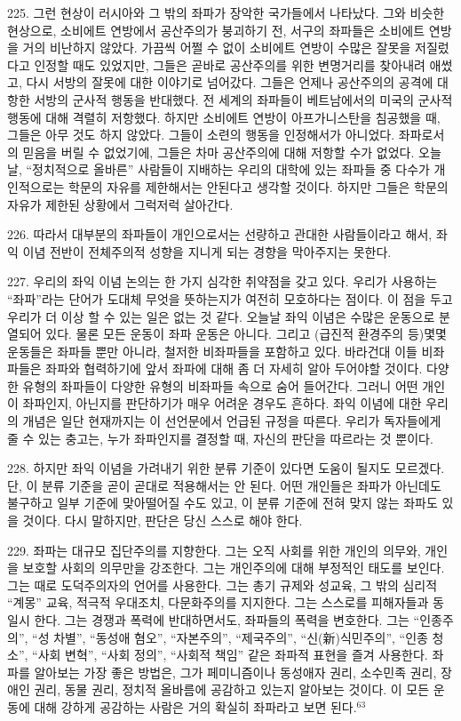 \documentclass[11pt,a4paper]{article}
\begin{document}
\begin{multicols}{2}
225. 그런 현상이 러시아와 그 밖의 좌파가 장악한 국가들에서 나타났다. 그와 비슷한 현상으로,  소비에트 연방에서 공산주의가 붕괴하기 전, 서구의 좌파들은 소비에트 연방을 거의 비난하지 않았다.  가끔씩 어쩔 수 없이 소비에트 연방이 수많은 잘못을 저질렀다고 인정할 때도 있었지만, 그들은 곧바로  공산주의를 위한 변명거리를 찾아내려 애썼고, 다시 서방의 잘못에 대한 이야기로 넘어갔다. 그들은  언제나 공산주의의 공격에 대항한 서방의 군사적 행동을 반대했다. 전 세계의 좌파들이 베트남에서의  미국의 군사적 행동에 대해 격렬히 저항했다. 하지만 소비에트 연방이 아프가니스탄을 침공했을 때,  그들은 아무 것도 하지 않았다. 그들이 소련의 행동을 인정해서가 아니었다. 좌파로서의 믿음을 버릴 수  없었기에, 그들은 차마 공산주의에 대해 저항할 수가 없었다. 오늘날, “정치적으로 올바른” 사람들이  지배하는 우리의 대학에 있는 좌파들 중 다수가 개인적으로는 학문의 자유를 제한해서는 안된다고 생각할 것이다. 하지만 그들은 학문의 자유가 제한된 상황에서 그럭저럭 살아간다. 


226. 따라서 대부분의 좌파들이 개인으로서는 선량하고 관대한 사람들이라고 해서, 좌익 이념 전반이  전체주의적 성향을 지니게 되는 경향을 막아주지는 못한다.  


227. 우리의 좌익 이념 논의는 한 가지 심각한 취약점을 갖고 있다. 우리가 사용하는 “좌파”라는 단어가  도대체 무엇을 뜻하는지가 여전히 모호하다는 점이다. 이 점을 두고 우리가 더 이상 할 수 있는 일은 없는  것 같다. 오늘날 좌익 이념은 수많은 운동으로 분열되어 있다. 물론 모든 운동이 좌파 운동은 아니다.  그리고 (급진적 환경주의 등)몇몇 운동들은 좌파들 뿐만 아니라, 철저한 비좌파들을 포함하고 있다.  바라건대 이들 비좌파들은 좌파와 협력하기에 앞서 좌파에 대해 좀 더 자세히 알아 두어야할 것이다.  다양한 유형의 좌파들이 다양한 유형의 비좌파들 속으로 숨어 들어간다. 그러니 어떤 개인이 좌파인지,  아닌지를 판단하기가 매우 어려운 경우도 흔하다. 좌익 이념에 대한 우리의 개념은 일단 현재까지는 이 
선언문에서 언급된 규정을 따른다. 우리가 독자들에게 줄 수 있는 충고는, 누가 좌파인지를 결정할 때,  자신의 판단을 따르라는 것 뿐이다.  


228. 하지만 좌익 이념을 가려내기 위한 분류 기준이 있다면 도움이 될지도 모르겠다. 단, 이 분류 기준을 곧이 곧대로 적용해서는 안 된다. 어떤 개인들은 좌파가 아닌데도 불구하고 일부 기준에 맞아떨어질 수도  있고, 이 분류 기준에 전혀 맞지 않는 좌파도 있을 것이다. 다시 말하지만, 판단은 당신 스스로 해야 한다. 


229. 좌파는 대규모 집단주의를 지향한다. 그는 오직 사회를 위한 개인의 의무와, 개인을 보호할 사회의  의무만을 강조한다. 그는 개인주의에 대해 부정적인 태도를 보인다. 그는 때로 도덕주의자의 언어를  사용한다. 그는 총기 규제와 성교육, 그 밖의 심리적 “계몽” 교육, 적극적 우대조치, 다문화주의를  지지한다. 그는 스스로를 피해자들과 동일시 한다. 그는 경쟁과 폭력에 반대하면서도, 좌파들의 폭력을  변호한다. 그는 “인종주의”, “성 차별”, “동성애 혐오”, “자본주의”, “제국주의”, “신(新)식민주의”, “인종 청소”, “사회 변혁”, “사회 정의”, “사회적 책임” 같은 좌파적 표현을 즐겨 사용한다. 좌파를 알아보는 가장  좋은 방법은, 그가 페미니즘이나 동성애자 권리, 소수민족 권리, 장애인 권리, 동물 권리, 정치적 올바름에 공감하고 있는지 알아보는 것이다. 이 모든 운동에 대해 강하게 공감하는 사람은 거의 확실히 좌파라고  보면 된다.\hyperlink{63}{$^{63}$} 



\end{multicols}
\end{document}
